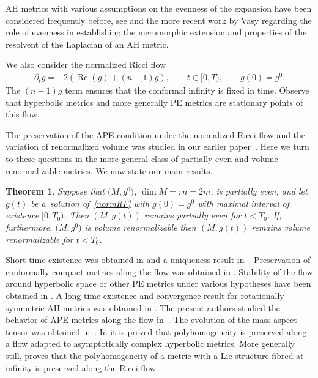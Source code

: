 \documentclass[11pt]{article}
\numberwithin{equation}{section}
\newtheorem{Theorem}{Theorem}[section]
\newcommand{\gin}{{g^0}}
\DeclareMathOperator{\Rc}{Rc}
\begin{document}
AH metrics with various assumptions on the evenness of the expansion have been considered frequently before,
see \cite{Guillarmou, MM} and the more recent work by Vasy \cite{V} regarding the role of evenness in establishing
the meromorphic extension and properties of the resolvent of the Laplacian of an AH metric.

We also consider the normalized Ricci flow
\begin{gather} \label{normRF}
\partial_t g = -2 ( \Rc(g) + (n-1)g ), \qquad t \in [0,T), \qquad g(0) = \gin.
\end{gather}
The $(n-1) g$ term ensures that the conformal infinity is fixed in time. Observe that hyperbolic metrics and more generally
PE metrics are stationary points of this flow.

The preservation of the APE condition under the normalized Ricci flow and the variation of renormalized volume was studied
in our earlier paper~\cite{BMW}. Here we turn to these questions in the more general class of partially even and volume renormalizable
metrics. We now state our main results.

\begin{Theorem}\label{TheoremA} Suppose that $\big(M,\gin\big)$, $\dim M =: n = 2m$, is partially even, and let $g(t)$ be a~solution of~\eqref{normRF} with $g(0) = \gin$
with maximal interval of existence $[0,T_0)$. Then $(M, g(t))$ remains partially even for $t < T_0$. If, furthermore, $\big(M,\gin\big)$ is volume renormalizable then $(M, g(t))$ remains volume renormalizable for $t < T_0$.
\end{Theorem}

\setcounter{section}{1}
\setcounter{subsection}{0}
\setcounter{subsubsection}{0}
\setcounter{Theorem}{2}
\setcounter{equation}{3}
Short-time existence was obtained in \cite{WXShi} and a uniqueness result in~\cite{Chen-Zhu}. Preservation of
conformally compact metrics along the flow was obtained in \cite{Bahuaud}. Stability of the flow around hyperbolic space
or other PE metrics under various hypotheses have been obtained in \cite{Bamler,QSW,SSS}. A long-time existence and
convergence result for rotationally symmetric AH metrics was obtained in \cite{BahuaudWoolgar}. The present authors
studied the behavior of APE metrics along the flow in~\cite{BMW}. The evolution of the mass aspect tensor was obtained in~\cite{BW}. In \cite{R} it is proved that polyhomogeneity is preserved along a flow adapted to asymptotically complex hyperbolic metrics. More generally still, \cite{Ammar} proves that the polyhomogeneity of a metric with a Lie structure fibred at infinity is preserved along the Ricci flow.
\end{document}
